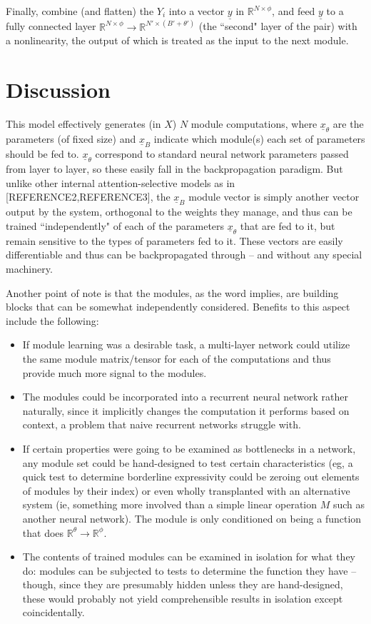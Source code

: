 \documentclass[12pt]{article}
\begin{document}
Finally, combine (and flatten) the $Y_i$ into a vector $\underline{y}$ in $\mathbb{R}^{N\times\phi}$, and feed $\underline{y}$ to a fully connected layer $\mathbb{R}^{N\times\phi} \rightarrow \mathbb{R}^{N'\times(B'+\theta')}$ (the ``second" layer of the pair) with a nonlinearity, the output of which is treated as the input to the next module.
\section{Discussion}\label{Discussion}
This model effectively generates (in $X$) $N$ module computations, where $\underline{x}_\theta$ are the parameters (of fixed size) and $\underline{x}_B$ indicate which module(s) each set of parameters should be fed to.  $\underline{x}_\theta$ correspond to standard neural network parameters passed from layer to layer, so these easily fall in the backpropagation paradigm.  But unlike other internal attention-selective models as in [REFERENCE2,REFERENCE3], the $\underline{x}_B$ module vector is simply another vector output by the system, orthogonal to the weights they manage, and thus can be trained ``independently" of each of the parameters $\underline{x}_\theta$ that are fed to it, but remain sensitive to the types of parameters fed to it.  These vectors are easily differentiable and thus can be backpropagated through -- and without any special machinery. \par
Another point of note is that the modules, as the word implies, are building blocks that can be somewhat independently considered.  Benefits to this aspect include the following:
\begin{itemize}
\item If module learning was a desirable task, a multi-layer network could utilize the same module matrix/tensor for each of the computations and thus provide much more signal to the modules.  
\item The modules could be incorporated into a recurrent neural network rather naturally, since it implicitly changes the computation it performs based on context, a problem that naive recurrent networks struggle with.  \item If certain properties were going to be examined as bottlenecks in a network, any module set could be hand-designed to test certain characteristics (eg, a quick test to determine borderline expressivity could be zeroing out elements of modules by their index) or even wholly transplanted with an alternative system (ie, something more involved than a simple linear operation $M$ such as another neural network).  The module is only conditioned on being a function that does $\mathbb{R}^{\theta} \rightarrow \mathbb{R}^{\phi}$.
\item The contents of trained modules can be examined in isolation for what they do: modules can be subjected to tests to determine the function they have -- though, since they are presumably hidden unless they are hand-designed, these would probably not yield comprehensible results in isolation except coincidentally.
\end{itemize}
\end{document}
